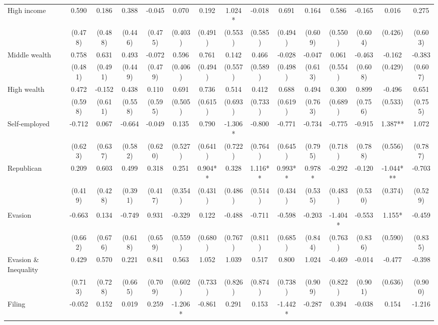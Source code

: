 \documentclass[11pt]{article}
\begin{document}
\begin{landscape}
\begin{table}[!htbp]
\begin{threeparttable}
\begin{tabular}{l||cc|cc|cc|cc|cc||cc||cc}
High income & 0.590 & 0.186 & 0.388 & -0.045 & 0.070 & 0.192 & 1.024* & -0.018 & 0.691 & 0.164 & 0.586 & -0.165 & 0.016 & 0.275 \\
 & (0.478) & (0.488) & (0.446) & (0.475) & (0.403) & (0.491) & (0.553) & (0.585) & (0.494) & (0.609) & (0.550) & (0.604) & (0.426) & (0.603) \\
Middle wealth & 0.758 & 0.631 & 0.493 & -0.072 & 0.596 & 0.761 & 0.142 & 0.466 & -0.028 & -0.047 & 0.061 & -0.463 & -0.162 & -0.383 \\
 & (0.481) & (0.491) & (0.449) & (0.479) & (0.406) & (0.494) & (0.557) & (0.589) & (0.498) & (0.613) & (0.554) & (0.608) & (0.429) & (0.607) \\
High wealth & 0.472 & -0.152 & 0.438 & 0.110 & 0.691 & 0.736 & 0.514 & 0.412 & 0.688 & 0.494 & 0.300 & 0.899 & -0.496 & 0.651 \\
 & (0.598) & (0.611) & (0.558) & (0.595) & (0.505) & (0.615) & (0.693) & (0.733) & (0.619) & (0.763) & (0.689) & (0.756) & (0.533) & (0.755) \\
Self-employed & -0.712 & 0.067 & -0.664 & -0.049 & 0.135 & 0.790 & -1.306* & -0.800 & -0.771 & -0.734 & -0.775 & -0.915 & 1.387** & 1.072 \\
 & (0.623) & (0.637) & (0.582) & (0.620) & (0.527) & (0.641) & (0.722) & (0.764) & (0.645) & (0.795) & (0.718) & (0.788) & (0.556) & (0.787) \\
Republican & 0.209 & 0.603 & 0.499 & 0.318 & 0.251 & 0.904** & 0.328 & 1.116** & 0.993** & 0.978* & -0.292 & -0.120 & -1.044*** & -0.703 \\
 & (0.419) & (0.428) & (0.391) & (0.417) & (0.354) & (0.431) & (0.486) & (0.514) & (0.434) & (0.535) & (0.483) & (0.530) & (0.374) & (0.529) \\
\\[0.5em]
Evasion & -0.663 & 0.134 & -0.749 & 0.931 & -0.329 & 0.122 & -0.488 & -0.711 & -0.598 & -0.203 & -1.404* & -0.553 & 1.155* & -0.459 \\
 & (0.662) & (0.676) & (0.618) & (0.659) & (0.559) & (0.680) & (0.767) & (0.811) & (0.685) & (0.844) & (0.763) & (0.836) & (0.590) & (0.835) \\
Evasion \& Inequality & 0.429 & 0.570 & 0.221 & 0.841 & 0.563 & 1.052 & 1.039 & 0.517 & 0.800 & 1.024 & -0.469 & -0.014 & -0.477 & -0.398 \\
 & (0.713) & (0.728) & (0.665) & (0.709) & (0.602) & (0.733) & (0.826) & (0.874) & (0.738) & (0.909) & (0.822) & (0.901) & (0.636) & (0.900) \\
Filing & -0.052 & 0.152 & 0.019 & 0.259 & -1.206* & -0.861 & 0.291 & 0.153 & -1.442* & -0.287 & 0.394 & -0.038 & 0.154 & -1.216 \\

\end{tabular}
\end{threeparttable}
\end{table}
\end{landscape}
\end{document}
